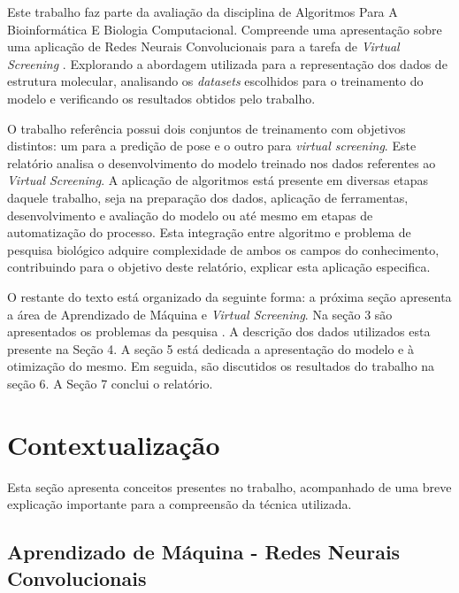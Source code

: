 \documentclass[utf8]{frontiersSCNS} %
\begin{document}
Este trabalho faz parte da avaliação da disciplina de Algoritmos Para A Bioinformática E Biologia Computacional. Compreende uma apresentação sobre uma aplicação de Redes Neurais Convolucionais para a tarefa de \textit{Virtual Screening} \cite{plscnn}. Explorando a abordagem utilizada para a representação dos dados de estrutura molecular, analisando os \textit{datasets} escolhidos para o treinamento do modelo e verificando os resultados obtidos pelo trabalho. 

O trabalho referência possui dois conjuntos de treinamento com objetivos distintos: um para a predição de pose e o outro para \textit{virtual screening}. Este relatório analisa o desenvolvimento do modelo treinado nos dados referentes ao \textit{Virtual Screening}. A aplicação de algoritmos está presente em diversas etapas daquele trabalho, seja na preparação dos dados, aplicação de ferramentas, desenvolvimento e avaliação do modelo ou até mesmo em etapas de automatização do processo. Esta integração entre algoritmo e problema de pesquisa biológico adquire complexidade de ambos os campos do conhecimento, contribuindo para o objetivo deste relatório, explicar esta aplicação especifica.

O restante do texto está organizado da seguinte forma: a próxima seção apresenta a área de Aprendizado de Máquina e \textit{Virtual Screening}. Na seção 3 são apresentados os problemas da pesquisa . A descrição dos dados utilizados esta presente na Seção 4. A seção 5 está dedicada a apresentação do modelo e à otimização do mesmo. Em seguida, são discutidos os resultados do trabalho na seção 6. A Seção 7 conclui o relatório.

\section{Contextualização} %

Esta seção apresenta conceitos presentes no trabalho, acompanhado de uma breve explicação importante para a compreensão da técnica utilizada. 

\subsection{Aprendizado de Máquina - Redes Neurais Convolucionais}
\end{document}

